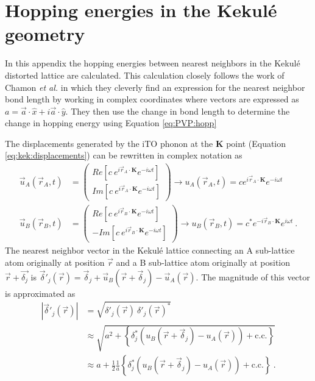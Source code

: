 \chapter{Hopping energies in the Kekul\'e geometry \label{chap:hopps}}

In this appendix the hopping energies between nearest neighbors in the Kekul\'e distorted lattice are calculated.
This calculation closely follows the work of Chamon \textit{et al.} \cite{Chamon2013} in which they cleverly find an expression for the nearest neighbor bond length by working in complex coordinates where vectors are expressed as $a=\vec{a} \cdot \hat{x}+i \vec{a} \cdot \hat{y}$.
They then use the change in bond length to determine the change in hopping energy using Equation \ref{eq:PVP:hopp}

The displacements generated by the iTO phonon at the $\bm{K}$ point (Equation \ref{eq:kek:displacements}) can be rewritten in complex notation as
\begin{align*}
	\vec{u}_A (\vec{r}_A,t)&=
		\left( \begin{array}{c} 
			Re[c \ e^{i\vec{r}_A \cdot \bm{K}} e^{-i \omega t}] \\
			Im[c \ e^{i\vec{r}_A \cdot \bm{K}} e^{-i \omega t}]
		\end{array} \right)
		\rightarrow u_A (\vec{r}_A,t) = c e^{i\vec{r}_A \cdot \bm{K}} e^{-i \omega t} \\
	\vec{u}_B (\vec{r}_B,t)&=
		\left( \begin{array}{c} 
			 Re[c \ e^{i\vec{r}_B \cdot \bm{K}} e^{-i \omega t}] \\
			-Im[c \ e^{i\vec{r}_B \cdot \bm{K}} e^{-i \omega t}]
		\end{array} \right)
		\rightarrow u_B (\vec{r}_B,t) = c^* e^{-i\vec{r}_B \cdot \bm{K}} e^{i \omega t} \ .
\end{align*}
The nearest neighbor vector in the Kekul\'e lattice connecting an A sub-lattice atom originally at position $\vec{r}$ and a B sub-lattice atom originally at position $\vec{r}+\vec{\delta_j}$ is 
$\vec{\delta}'_j(\vec{r})=\vec{\delta}_j+\vec{u}_B(\vec{r}+\vec{\delta}_j)-\vec{u}_A(\vec{r})$.
The magnitude of this vector is approximated as
\begin{align*}
	|\vec{\delta}'_j(\vec{r})|&=\sqrt{ \delta'_j(\vec{r}) \ \delta'_j(\vec{r})^* } \\
	&\approx \sqrt{a^2+\left\{ \delta_j^* \left(u_B(\vec{r}+\vec{\delta}_j)-u_A(\vec{r}) \right)+\text{c.c.} \right\} } \\
	&\approx a + \frac{1}{2} \frac{1}{a} \left\{ \delta_j^* \left(u_B(\vec{r}+\vec{\delta}_j)-u_A(\vec{r}) \right) + \text{c.c.}  \right\} \ .
\end{align*}
